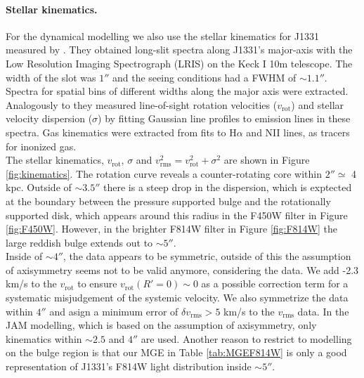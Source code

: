 \paragraph{Stellar kinematics.} For the dynamical modelling we also use the stellar kinematics for J1331 measured by \citet{SWELLSV}. They obtained long-slit spectra along J1331's major-axis with the Low Resolution Imaging Spectrograph (LRIS) on the Keck I 10m telescope. The width of the slot was $1''$ and the seeing conditions had a FWHM of $\sim 1.1''$. Spectra for spatial bins of different widths along the major axis were extracted. Analogously to \citet{SWELLSII} they measured line-of-sight rotation velocities ($v_\text{rot}$) and stellar velocity dispersion ($\sigma$) by fitting Gaussian line profiles to emission lines in these spectra. Gas kinematics were extracted from fits to H$\alpha$ and NII lines, as tracers for inonized gas.
\\The stellar kinematics, $v_\text{rot}$, $\sigma$ and $v_\text{rms}^2=v_\text{rot}^2 + \sigma^2$ are shown in Figure \ref{fig:kinematics}. The rotation curve reveals a counter-rotating core within $2''\simeq$ 4 kpc. Outside of $\sim 3.5''$ there is a steep drop in the dispersion, which is exptected at the boundary between the pressure supported bulge and the rotationally supported disk, which appears around this radius in the F450W filter in Figure \ref{fig:F450W}. However, in the brighter F814W filter in Figure \ref{fig:F814W}  the large reddish bulge extends out to $\sim5''$. 
\\Inside of $\sim 4''$, the data appears to be symmetric, outside of this the assumption of axisymmetry seems not to be valid anymore, considering the data. We add -2.3 km/s to the $v_\text{rot}$ to ensure $v_\text{rot}(R'=0) \sim 0$ as a possible correction term for a systematic misjudgement of the systemic velocity. We also symmetrize the data within $4''$ and asign a minimum error of $\delta v_\text{rms} > 5$ km/s to the $v_\text{rms}$ data. In the JAM modelling, which is based on the assumption of axisymmetry, only kinematics within $\sim 2.5$ and $4''$ are used. Another reason to restrict to modelling on the bulge region is that our MGE in Table \ref{tab:MGEF814W} is only a good representation of J1331's F814W light distribution inside $\sim 5''$.\\

